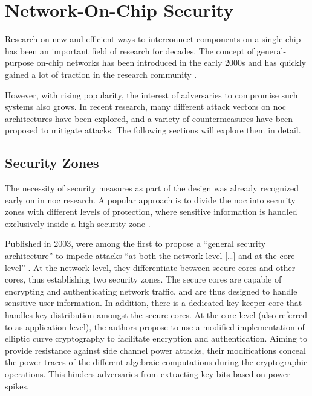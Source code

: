 \section{Network-On-Chip Security}\label{sec:networkonchipsecurity}
Research on new and efficient ways to interconnect components on a single chip has been an important field of research for decades. The concept of
general-purpose on-chip networks has been introduced in the early 2000s
\cites{dally01routepacketsnotwires}{kumar02networkonchip}{benini02nocparadigm} and has quickly gained a lot of traction in the research community
\cite[e.g.][]{ivanov05nocintroduction}. 

However, with rising popularity, the interest of adversaries to compromise such systems also grows. In recent research, many different attack vectors
on \gls{noc} architectures have been explored, and a variety of countermeasures have been proposed to mitigate attacks. The following sections will
explore them in detail.

\subsection{Security Zones}
The necessity of security measures as part of the design was already recognized early on in \gls{noc} research. A popular approach is to
divide the \gls{noc} into security zones with different levels of protection, where sensitive information is handled exclusively inside a
high-security zone \cites(e.g.)(){gebotys03securityframework}{fernandes16nocrouting}{kapoor13nocauthenc}.

Published in 2003, \citeauthor{gebotys03securityframework} \cite{gebotys03securityframework} were among the first to propose a \enquote{general security architecture}
\cite[1]{gebotys03securityframework} to impede attacks \enquote{at both the network level […] and at the core level}
\cite[1]{gebotys03securityframework}. At the network level, they differentiate between secure cores and other cores, thus establishing two security
zones. The secure cores are capable of encrypting and authenticating network
traffic, and are thus designed to handle sensitive user information. In addition, there is a dedicated key-keeper core that handles key distribution
amongst the secure cores. At the core level (also referred to as application level), the authors propose to use a modified implementation of elliptic curve
cryptography to facilitate encryption and authentication. Aiming to provide resistance against side channel power attacks, their modifications conceal
the power traces of the different algebraic computations during the cryptographic operations. This hinders adversaries from extracting key bits based
on power spikes.

